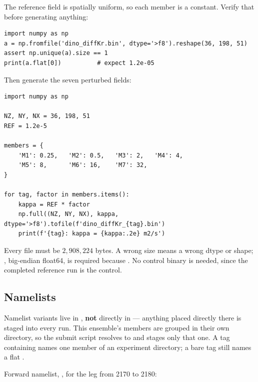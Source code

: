 The reference field is spatially uniform, so each member is a constant. Verify
that before generating anything:

\begin{footnotesize}
\begin{verbatim}
import numpy as np
a = np.fromfile('dino_diffKr.bin', dtype='>f8').reshape(36, 198, 51)
assert np.unique(a).size == 1
print(a.flat[0])          # expect 1.2e-05
\end{verbatim}
\end{footnotesize}

Then generate the seven perturbed fields:

\begin{footnotesize}
\begin{verbatim}
import numpy as np

NZ, NY, NX = 36, 198, 51
REF = 1.2e-5

members = {
    'M1': 0.25,   'M2': 0.5,   'M3': 2,   'M4': 4,
    'M5': 8,      'M6': 16,    'M7': 32,
}

for tag, factor in members.items():
    kappa = REF * factor
    np.full((NZ, NY, NX), kappa, dtype='>f8').tofile(f'dino_diffKr_{tag}.bin')
    print(f'{tag}: kappa = {kappa:.2e} m2/s')
\end{verbatim}
\end{footnotesize}

Every file must be $2{,}908{,}224$ bytes. A wrong size means a wrong dtype or
shape; , big-endian float64, is required because
. No control binary is needed, since the completed
reference run is the control.

\subsection{Namelists}
\label{app:namelists}

Namelist variants live in , \textbf{not} directly in
 --- anything placed directly there is staged into every run.
This ensemble's members are grouped in their own directory, so the submit
script resolves  to
 and stages only that one. A tag
containing \code{/} names one member of an experiment directory; a bare tag
still names a flat .

Forward namelist, , for the
leg from 2170 to 2180:

